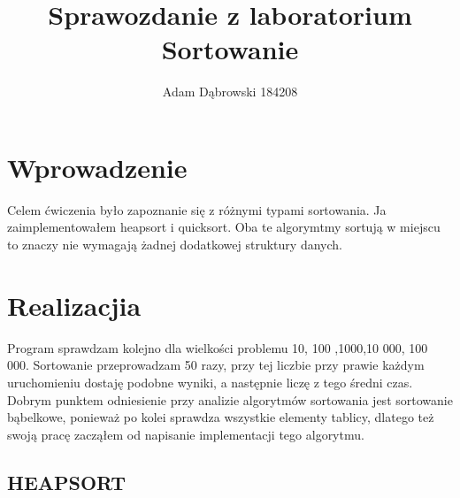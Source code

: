 \documentclass[a4paper,11pt]{report}
\title{\textbf{Sprawozdanie z laboratorium\\Sortowanie}}
\author{Adam Dąbrowski 184208}
\begin{document}
\maketitle
\chapter{Wprowadzenie}

Celem ćwiczenia było zapoznanie się z różnymi typami sortowania. Ja zaimplementowałem heapsort i quicksort. Oba te algorymtmy sortują w miejscu to znaczy nie wymagają żadnej dodatkowej struktury danych.  

\chapter{Realizacjia}

Program sprawdzam kolejno dla wielkości problemu 10, 100 ,1000,10 000, 100 000. Sortowanie przeprowadzam 50 razy, przy tej liczbie przy prawie każdym uruchomieniu dostaję podobne wyniki, a następnie liczę z tego średni czas. Dobrym punktem odniesienie przy analizie algorytmów sortowania jest sortowanie bąbelkowe, ponieważ po kolei sprawdza wszystkie elementy tablicy, dlatego też swoją pracę zacząłem od napisanie implementacji tego algorytmu.
\newpage 
\section{HEAPSORT}
\end{document}
